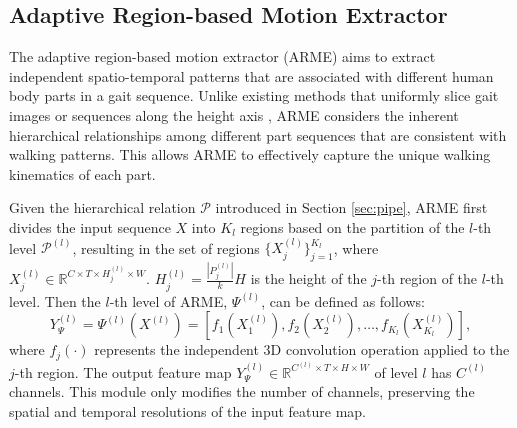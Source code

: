 \documentclass[10pt,twocolumn,letterpaper]{article}
\begin{document}
\subsection{Adaptive Region-based Motion Extractor}
\label{sec:pyra}

The adaptive region-based motion extractor (ARME) aims to extract independent spatio-temporal patterns that are associated with different human body parts in a gait sequence. Unlike existing methods that uniformly slice gait images or sequences along the height axis \cite{zhang2019cross,fan2020gaitpart,lin2021gait,lin2021gaitmask}, ARME considers the inherent hierarchical relationships among different part sequences that are consistent with walking patterns. This allows ARME to effectively capture the unique walking kinematics of each part.

Given the hierarchical relation $\mathcal{P}$ introduced in Section \ref{sec:pipe}, ARME first divides the input sequence $X$ into $K_l$ regions based on the partition of the $l$-th level $\mathcal{P}^{(l)}$, resulting in the set of regions $\{X_{j}^{(l)}\}_{j=1}^{K_l}$, where $X_{j}^{(l)} \in \mathbb{R}^{C \times T \times H_j^{(l)} \times W}$. $H^{(l)}_j=\frac{\left|P_j^{(l)}\right|}{k}H$ is the height of the $j$-th region of the $l$-th level. Then the $l$-th level of ARME, $\Psi^{(l)}$, can be defined as follows:
\begin{equation}
    Y^{(l)}_{\Psi}=\Psi^{(l)}(X^{(l)})=\left[f_{1}(X_{1}^{(l)}), f_{2}(X_{2}^{(l)}) ,\ldots, f_{K_l}(X_{K_l}^{(l)})  \right],
\end{equation}
where $f_{j}\left(\cdot\right)$ represents the independent 3D convolution operation applied to the $j$-th region. The output feature map $Y^{(l)}_{\Psi} \in \mathbb{R}^{C^{(l)} \times T \times H \times W}$ of level $l$ has $C^{(l)}$ channels. This module only modifies the number of channels, preserving the spatial and temporal resolutions of the input feature map.




\end{document}
